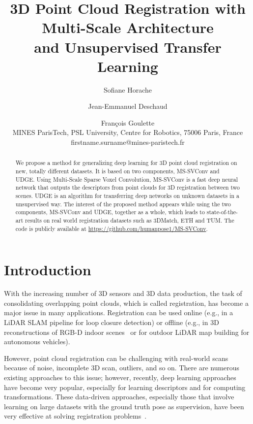 \documentclass[10pt,twocolumn,letterpaper]{article}
\begin{document}
\title{3D Point Cloud Registration with Multi-Scale Architecture 
\\ and Unsupervised Transfer Learning}

\author{Sofiane Horache
\and Jean-Emmanuel Deschaud 
\and François Goulette\\
MINES ParisTech, PSL University, Centre for Robotics, 75006 Paris, France\\
\small{firstname.surname@mines-paristech.fr}\\
}
\maketitle


\begin{abstract}
  We propose a method for generalizing deep learning for 3D point cloud registration on new, totally different datasets. It is based on two components, MS-SVConv and UDGE.
  Using Multi-Scale Sparse Voxel Convolution, MS-SVConv is a fast deep neural network that outputs the descriptors from point clouds for 3D registration between two scenes. 
  UDGE is an algorithm for transferring deep networks on unknown datasets in a unsupervised way.
  The  interest  of  the  proposed  method  appears  while  using the two components, MS-SVConv and UDGE, together as a whole, which leads to state-of-the-art results on real world registration datasets such as 3DMatch, ETH and TUM. The code is publicly available at \url{https://github.com/humanpose1/MS-SVConv}.
\end{abstract}

\section{Introduction}



With the increasing number of 3D sensors and 3D data production, the task of consolidating overlapping point clouds, which is called registration, has become a major issue in many applications. Registration can be used online (e.g., in a LiDAR SLAM pipeline for loop closure detection) or offline (e.g., in 3D reconstructions of RGB-D indoor scenes~\cite{7299195} or for outdoor LiDAR map building for autonomous vehicles).


However, point cloud registration can be challenging with real-world scans because of noise, incomplete 3D scan, outliers, and so on. There are numerous existing approaches to this issue; however, recently, deep learning approaches have become very popular, especially for learning descriptors and for computing transformations. 
These data-driven approaches, especially those that involve learning on large datasets with the ground truth pose as supervision, have been very effective at solving registration problems~\cite{zeng20163dmatch, deng2018ppffoldnet, gojcic2018perfect, gojcic2020learning, aoki2019pointnetlk, bai2020d3feat, deng2018ppfnet,choy2019fully,choy2020deep}.
\end{document}
